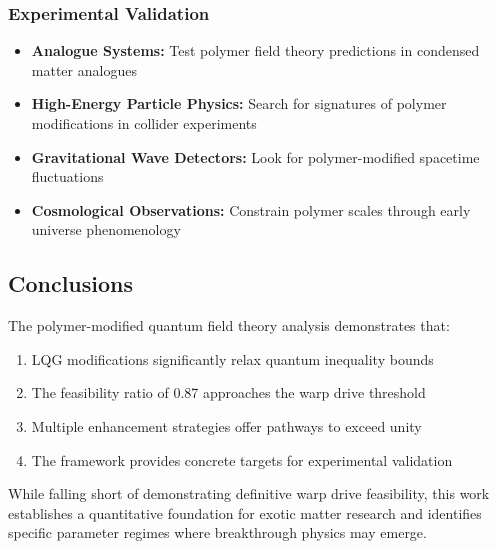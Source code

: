 \documentclass[11pt]{article}
\begin{document}
\subsubsection*{Experimental Validation}
\begin{itemize}
  \item \textbf{Analogue Systems:} Test polymer field theory predictions in condensed matter analogues
  \item \textbf{High-Energy Particle Physics:} Search for signatures of polymer modifications in collider experiments  
  \item \textbf{Gravitational Wave Detectors:} Look for polymer-modified spacetime fluctuations
  \item \textbf{Cosmological Observations:} Constrain polymer scales through early universe phenomenology
\end{itemize}

\subsection*{Conclusions}
The polymer-modified quantum field theory analysis demonstrates that:
\begin{enumerate}
  \item LQG modifications significantly relax quantum inequality bounds
  \item The feasibility ratio of 0.87 approaches the warp drive threshold
  \item Multiple enhancement strategies offer pathways to exceed unity
  \item The framework provides concrete targets for experimental validation
\end{enumerate}

While falling short of demonstrating definitive warp drive feasibility, this work establishes a quantitative foundation for exotic matter research and identifies specific parameter regimes where breakthrough physics may emerge.
\end{document}
